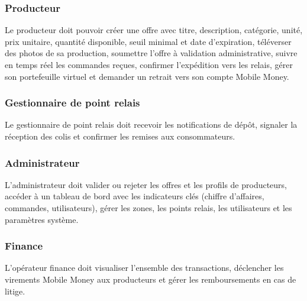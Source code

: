 \documentclass[12pt, a4paper, oneside]{report}
\begin{document}
\subsubsection{Producteur}

Le producteur doit pouvoir créer une offre avec titre, description, catégorie, unité, prix
unitaire, quantité disponible, seuil minimal et date d'expiration, téléverser des photos de
sa production, soumettre l'offre à validation administrative, suivre en temps réel les
commandes reçues, confirmer l'expédition vers les relais, gérer son portefeuille virtuel
et demander un retrait vers son compte Mobile Money.

\subsubsection{Gestionnaire de point relais}

Le gestionnaire de point relais doit recevoir les notifications de dépôt, signaler la
réception des colis et confirmer les remises aux consommateurs.

\subsubsection{Administrateur}

L'administrateur doit valider ou rejeter les offres et les profils de producteurs, accéder
à un tableau de bord avec les indicateurs clés (chiffre d'affaires, commandes, utilisateurs),
gérer les zones, les points relais, les utilisateurs et les paramètres système.

\subsubsection{Finance}

L'opérateur finance doit visualiser l'ensemble des transactions, déclencher les virements
Mobile Money aux producteurs et gérer les remboursements en cas de litige.
\end{document}
